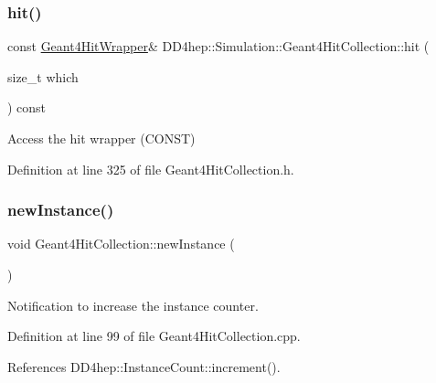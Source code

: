 \subsubsection{\texorpdfstring{hit()}{hit()}\hspace{0.1cm}{\footnotesize\ttfamily [2/2]}}
{\footnotesize\ttfamily const \hyperlink{class_d_d4hep_1_1_simulation_1_1_geant4_hit_wrapper}{Geant4\+Hit\+Wrapper}\& D\+D4hep\+::\+Simulation\+::\+Geant4\+Hit\+Collection\+::hit (\begin{DoxyParamCaption}\item[{size\+\_\+t}]{which }\end{DoxyParamCaption}) const\hspace{0.3cm}{\ttfamily [inline]}}



Access the hit wrapper (C\+O\+N\+ST) 



Definition at line 325 of file Geant4\+Hit\+Collection.\+h.

\hypertarget{class_d_d4hep_1_1_simulation_1_1_geant4_hit_collection_abd59378fa4d12c151299841d340fd63e}{}\label{class_d_d4hep_1_1_simulation_1_1_geant4_hit_collection_abd59378fa4d12c151299841d340fd63e} 
\subsubsection{\texorpdfstring{new\+Instance()}{newInstance()}}
{\footnotesize\ttfamily void Geant4\+Hit\+Collection\+::new\+Instance (\begin{DoxyParamCaption}{ }\end{DoxyParamCaption})\hspace{0.3cm}{\ttfamily [protected]}}



Notification to increase the instance counter. 



Definition at line 99 of file Geant4\+Hit\+Collection.\+cpp.



References D\+D4hep\+::\+Instance\+Count\+::increment().

\hypertarget{class_d_d4hep_1_1_simulation_1_1_geant4_hit_collection_ac36ede05cde4cfc230a06e7ca7886eef}{}\label{class_d_d4hep_1_1_simulation_1_1_geant4_hit_collection_ac36ede05cde4cfc230a06e7ca7886eef} 
